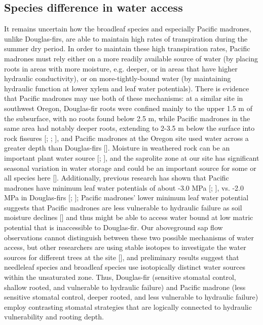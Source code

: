 \subsection{Species difference in water access}
It remains uncertain how the broadleaf species and especially Pacific madrones, unlike Douglas-firs, are able to maintain high rates of transpiration during the summer dry period. In order to maintain these high transpiration rates, Pacific madrones must rely either on a more readily available source of water (by placing roots in areas with more moisture, e.g. deeper, or in areas that have higher hydraulic conductivity), or on more-tightly-bound water (by maintaining hydraulic function at lower xylem and leaf water potentials).  There is evidence that Pacific madrones may use both of these mechanisms: at a similar site in southwest Oregon, Douglas-fir roots were confined mainly to the upper 1.5 m of the subsurface, with no roots found below 2.5 m, while Pacific madrones in the same area had notably deeper roots, extending to 2-3.5 m below the surface into rock fissures [\cite{wang1995competitive}; \cite{zwien95};  \cite{zwien96}], and Pacific madrones at the Oregon site used water across a greater depth than Douglas-firs [\cite{zwien96}].  Moisture in weathered rock can be an important plant water source [\cite{schwinning2010ecohydrology}; \cite{schwinning2013we}], and the saprolite zone at our site has significant seasonal variation in water storage and could be an important source for some or all species here [\cite{salve2012rain}].  Additionally, previous research has shown that Pacific madrones have minimum leaf water potentials of about -3.0 MPa [\cite{morrow1974drought}; \cite{wang1995competitive}], vs. -2.0 MPa in Douglas-firs [\cite{running1976environmental}; \cite{wang1995competitive}]; Pacific madrones' lower minimum leaf water potential suggests that Pacific madrones are less vulnerable to hydraulic failure as soil moisture declines [\cite{choat2012global}] and thus might be able to access water bound at low matric potential that is inaccessible to Douglas-fir. Our aboveground sap flow observations cannot distinguish between these two possible mechanisms of water access, but other researchers are using stable isotopes to investigate the water sources for different trees at the site [\cite{oshun2012}], and preliminary results suggest that needleleaf species and broadleaf species use isotopically distinct water sources within the unsaturated zone.  Thus, Douglas-fir (sensitive stomatal control, shallow rooted, and vulnerable to hydraulic failure) and Pacific madrone (less sensitive stomatal control, deeper rooted, and less vulnerable to hydraulic failure) employ contrasting stomatal strategies that are logically connected to hydraulic vulnerability and rooting depth.

